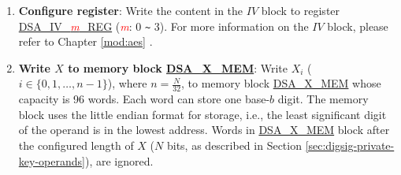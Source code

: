 \documentclass[main\_\_EN.tex]{subfiles}
\begin{document}
\begin{enumerate}
    If the software does not read 0 in \hyperref[regdesc:DSAQUERYBUSYREG]{DSA\_QUERY\_BUSY\_REG} after approximately 1 ms, it indicates a problem with HMAC initialization. In such a case, the software can read register \hyperref[regdesc:DSAQUERYKEYWRONGREG]{DSA\_QUERY\_KEY\_WRONG\_REG} to get more information:

    \begin{itemize}

        \item If the software reads 0 in \hyperref[regdesc:DSAQUERYKEYWRONGREG]{DSA\_QUERY\_KEY\_WRONG\_REG}, it indicates that the HMAC peripheral has not been called.

        \item If the software reads any value from 1 to 15 in \hyperref[regdesc:DSAQUERYKEYWRONGREG]{DSA\_QUERY\_KEY\_WRONG\_REG}, it indicates that HMAC was called, but the RSA\_DS peripheral did not successfully get \begin{math}RSA\_DS\_KEY\end{math} from the HMAC peripheral. This may indicate that the HMAC operation has been interrupted due to a software concurrency problem.

    \end{itemize}

    \item {\bfseries Configure register}: Write the content in the \begin{math}IV\end{math} block to register \hyperref[regdesc:DSAIVREG]{DSA\_IV\_\textcolor{red}{\it{m}}\_REG} (\textcolor{red}{\it{m}}: 0 \verb+~+ 3). For more information on the \begin{math}IV\end{math} block, please refer to Chapter \ref{mod:aes} \textit{}.

    \item {\bfseries Write \begin{math}X\end{math} to memory block \hyperref[DSAXMEM]{DSA\_X\_MEM}}: Write \begin{math}X_{i}\end{math}
        (\begin{math}i \in \{ 0, 1, \dots, n-1 \} \end{math}), where \begin{math} n = \frac{N}{32} \end{math}, to memory block \hyperref[DSAXMEM]{DSA\_X\_MEM} whose capacity is 96 words. Each word can store one base-\begin{math}b\end{math} digit. The memory block uses the little endian format for storage, i.e., the least significant digit of the operand is in the lowest address. Words in \hyperref[DSAXMEM]{DSA\_X\_MEM} block after the configured length of \begin{math}X\end{math} (\begin{math}N\end{math} bits, as described in Section \ref{sec:digsig-private-key-operands}), are ignored.


\end{enumerate}
\end{document}
